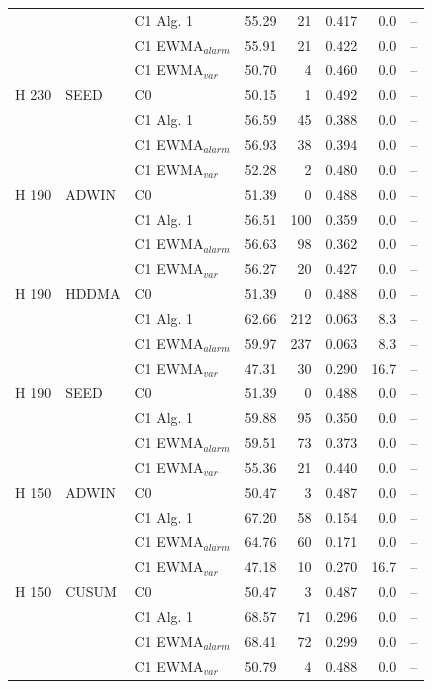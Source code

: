 \begin{longtable}{lllrrrrr}
 &  & C1 Alg. 1 & 55.29 & 21 & 0.417 & 0.0 & -- \\
 &  & C1 EWMA$_{alarm}$ & 55.91 & 21 & 0.422 & 0.0 & -- \\
 &  & C1 EWMA$_{var}$ & 50.70 & 4 & 0.460 & 0.0 & -- \\
\hline
H  230 & SEED & C0 & 50.15 & 1 & 0.492 & 0.0 & -- \\
 &  & C1 Alg. 1 & 56.59 & 45 & 0.388 & 0.0 & -- \\
 &  & C1 EWMA$_{alarm}$ & 56.93 & 38 & 0.394 & 0.0 & -- \\
 &  & C1 EWMA$_{var}$ & 52.28 & 2 & 0.480 & 0.0 & -- \\
\hline
H  190 & ADWIN & C0 & 51.39 & 0 & 0.488 & 0.0 & -- \\
 &  & C1 Alg. 1 & 56.51 & 100 & 0.359 & 0.0 & -- \\
 &  & C1 EWMA$_{alarm}$ & 56.63 & 98 & 0.362 & 0.0 & -- \\
 &  & C1 EWMA$_{var}$ & 56.27 & 20 & 0.427 & 0.0 & -- \\
\hline
H  190 & HDDMA & C0 & 51.39 & 0 & 0.488 & 0.0 & -- \\
 &  & C1 Alg. 1 & 62.66 & 212 & 0.063 & 8.3 & -- \\
 &  & C1 EWMA$_{alarm}$ & 59.97 & 237 & 0.063 & 8.3 & -- \\
 &  & C1 EWMA$_{var}$ & 47.31 & 30 & 0.290 & 16.7 & -- \\
\hline
H  190 & SEED & C0 & 51.39 & 0 & 0.488 & 0.0 & -- \\
 &  & C1 Alg. 1 & 59.88 & 95 & 0.350 & 0.0 & -- \\
 &  & C1 EWMA$_{alarm}$ & 59.51 & 73 & 0.373 & 0.0 & -- \\
 &  & C1 EWMA$_{var}$ & 55.36 & 21 & 0.440 & 0.0 & -- \\
\hline
H  150 & ADWIN & C0 & 50.47 & 3 & 0.487 & 0.0 & -- \\
 &  & C1 Alg. 1 & 67.20 & 58 & 0.154 & 0.0 & -- \\
 &  & C1 EWMA$_{alarm}$ & 64.76 & 60 & 0.171 & 0.0 & -- \\
 &  & C1 EWMA$_{var}$ & 47.18 & 10 & 0.270 & 16.7 & -- \\
\hline
H  150 & CUSUM & C0 & 50.47 & 3 & 0.487 & 0.0 & -- \\
 &  & C1 Alg. 1 & 68.57 & 71 & 0.296 & 0.0 & -- \\
 &  & C1 EWMA$_{alarm}$ & 68.41 & 72 & 0.299 & 0.0 & -- \\
 &  & C1 EWMA$_{var}$ & 50.79 & 4 & 0.488 & 0.0 & -- \\

\end{longtable}
